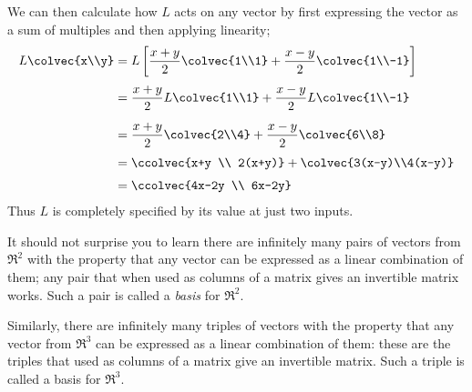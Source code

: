 \begin{example}
\[\]
We can then calculate how $L$ acts on any vector by first expressing the vector as  a sum of multiples and then applying linearity;
\begin{align*}
L\colvec{x\\y}
&=L\left[    \frac{x+y}{2} \colvec{1\\1} + \frac{x-y}{2} \colvec{1\\-1}  \right]\\[1mm]
&=\frac{x+y}{2} L \colvec{1\\1} + \frac{x-y}{2} L \colvec{1\\-1} \\[2mm]
&=\frac{x+y}{2} \colvec{2\\4} + \frac{x-y}{2}  \colvec{6\\8} \\[1mm]
&=\ccolvec{x+y \\ 2(x+y)} +  \colvec{3(x-y)\\4(x-y)}\\[1mm]
&=\ccolvec{4x-2y \\ 6x-2y}
\end{align*}
Thus $L$ is completely specified by its value at just two inputs. 
\end{example}

It should not surprise you to learn there are infinitely many pairs of vectors from $\Re^2$ 
with the property that any vector can be expressed as a linear combination of them; any pair that when used as columns of a matrix gives an invertible matrix works. Such a pair is called a {\itshape basis} for $\Re^2$.

Similarly, there are infinitely many triples of vectors with the property that any vector from $\Re^3$ can be expressed as a linear combination of them: these are the triples that used as columns of a matrix give an invertible matrix. Such a triple is called a basis for $\Re^3$.


